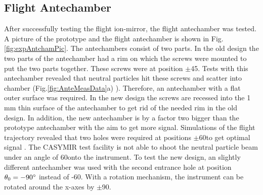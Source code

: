 	\subsection{Flight Antechamber } \label{subsec:ExpAnteCham}
	After successfully testing the flight ion-mirror, the flight antechamber was tested. A picture of the prototype and the flight antechamber is shown in Fig.\,\ref{fig:expAntchamPic}. The antechambers consist of two parts. In the old design the two parts of the antechamber had a rim on which the screws were mounted to put the two parts together. These screws were at position $\pm$45\degree. Tests with this antechamber revealed that neutral particles hit these screws and scatter into chamber (Fig.\ref{fig:AnteMeasData}a) \cite{Meyer_2017_ante}). Therefore, an antechamber with a flat outer surface was required. In the new design the screws are recessed into the 1\,\si{\milli\meter} thin surface of the antechamber to get rid of the needed rim in the old design. In addition, the new antechamber is by a factor two bigger than the prototype antechamber with the aim to get more signal. Simulations of the flight trajectory revealed that two holes were required at positions $\pm$60\degree to get optimal signal \cite{SOC_Crema3p2}. The CASYMIR test facility is not able to shoot the neutral particle beam under an angle of 60\degree onto the instrument. To test the new design, an slightly different antechamber was used with the second entrance hole at position $\theta_0 = -90^\circ$ instead of -60\degree. With a rotation mechanism, the instrument can be rotated around the x-axes by $\pm$90\degree.\\
